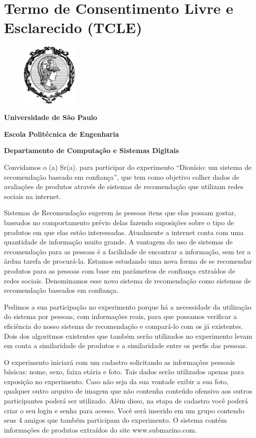 \appendix
\chapter {Termo de Consentimento Livre e Esclarecido (TCLE)}
\label{cha:TCLE}

\begin{figure}[ht]
  \centering
  \includegraphics[width=2.76cm]{imagens/minerva.png}
\end{figure}
\centerline{\textbf{Universidade de São Paulo}}
\centerline{\textbf{Escola Politécnica de Engenharia}}
\centerline{\textbf{Departamento de Computação e Sistemas Digitais}}
\vspace{0.3in}
 Convidamos o (a) Sr(a). para participar do experimento ``Dionísio: um sistema de recomendação baseado em confiança'', que tem como objetivo colher dados de avaliações de produtos através de sistemas de recomendação que utilizam redes sociais na internet.

 Sistemas de Recomendação sugerem às pessoas itens que elas possam gostar, baseados no comportamento prévio delas fazendo suposições sobre o tipo de produtos em que elas estão interessadas. Atualmente a internet conta com uma quantidade de informação muito grande. A vantagem do uso de sistemas de recomendação para as pessoas é a facilidade de encontrar a informação, sem ter a árdua tarefa de procurá-la. Estamos estudando uma nova forma de se recomendar produtos para as pessoas com base em parâmetros de confiança extraídos de redes sociais. Denominamos esse novo sistema de recomendação como sistemas de recomendação baseados em confiança.
	
 Pedimos a sua participação no experimento porque há a necessidade da utilização do sistema por pessoas, com informações reais, para que possamos verificar a eficiência do nosso sistema de recomendação e compará-lo com os já existentes. Dois dos algoritmos existentes que também serão utilizados no experimento levam em conta a similaridade de produtos e a similaridade entre os perfis das pessoas.

 O experimento iniciará com um cadastro solicitando as informações pessoais básicas: nome, sexo, faixa etária e foto. Tais dados serão utilizados apenas para exposição no experimento. Caso não seja da sua vontade exibir a sua foto, qualquer outro arquivo de imagem que não contenha conteúdo ofensivo aos outros participantes poderá ser utilizado. Além disso, na etapa de cadastro você poderá criar o seu login e senha para acesso. Você será inserido em um grupo contendo seus 4 amigos que também participam do experimento. O sistema contém informações de produtos extraídos do site www.submarino.com.

